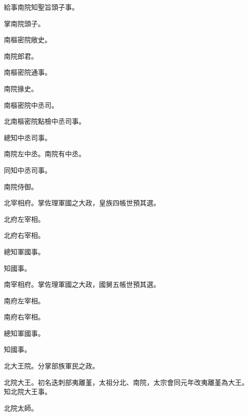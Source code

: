 \begin{pinyinscope}
 給事南院知聖旨頭子事。



 掌南院頭子。



 南樞密院敞史。



 南院郎君。



 南樞密院通事。



 南院掾史。



 南樞密院中丞司。



 北南樞密院點檢中丞司事。



 總知中丞司事。



 南院左中丞。南院有中丞。



 同知中丞司事。



 南院侍御。



 北宰相府。掌佐理軍國之大政，皇族四帳世預其選。



 北府左宰相。



 北府右宰相。



 總知軍國事。



 知國事。



 南宰相府。掌佐理軍國之大政，國舅五帳世預其選。



 南府左宰相。



 南府右宰相。



 總知軍國事。



 知國事。



 北大王院。分掌部族軍民之政。



 北院大王。初名迭刺部夷離堇，太祖分北、南院，太宗會同元年改夷離堇為大王。知北院大王事。



 北院太師。




\end{pinyinscope}
